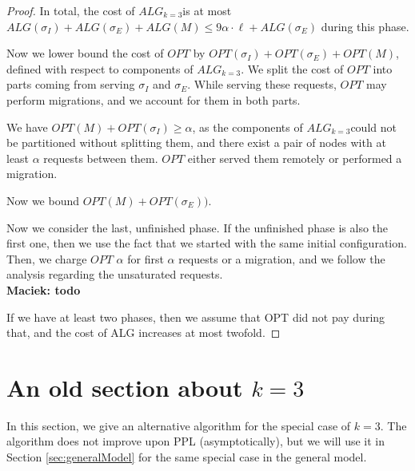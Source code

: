 \documentclass[manuscript,screen=true]{acmart}
\newcommand{\OPT}{\mathit{OPT}}
\newcommand{\TAlg}{{\ensuremath{ALG_{k=3}}}} %
\newcommand\maciek[1]{\color{brown}\textbf{\\ Maciek: #1}\color{black}}
\begin{document}
\begin{appendix}
\begin{proof}

    In total, the cost of \TAlg is at most $ALG(\sigma_I) + ALG(\sigma_E) + ALG(M) \leq 9\alpha\cdot \ell + ALG(\sigma_E)$ during this phase.

    \medskip

    Now we lower bound the cost of $\OPT$ by $\OPT(\sigma_I) +\OPT(\sigma_E)+\OPT(M)$, defined with respect to components of \TAlg.
    We split the cost of $\OPT$ into parts coming from serving $\sigma_I$ and $\sigma_E$.
    While serving these requests, $\OPT$ may perform migrations, and we account for them in both parts.


    We have $OPT(M) + OPT(\sigma_I) \geq \alpha$, as the components of \TAlg could not be partitioned without splitting them, and there exist a pair of nodes with at least $\alpha$ requests between them.
    $\OPT$ either served them remotely or performed a migration.

    Now we bound $\OPT(M) + \OPT(\sigma_E))$.

    \medskip

    Now we consider the last, unfinished phase.
    If the unfinished phase is also the first one, then we use the fact that we started with the same initial configuration.
    Then, we charge $\OPT$ $\alpha$ for first $\alpha$ requests or a migration,
    and we follow the analysis regarding the unsaturated requests.
    \maciek{todo}

    If we have at least two phases, then we assume that OPT did not pay during that, and the cost of ALG increases at most twofold.
  \end{proof}
  

  \section{An old section about $k=3$}

  \label{sec:k3}
  In this section,
  we give an alternative algorithm for the special case of $k=3$.
  The algorithm does not  improve upon PPL (asymptotically),
  but we will use it in Section \ref{sec:generalModel} for the same special case in the general model.
  

\end{appendix}
\end{document}
